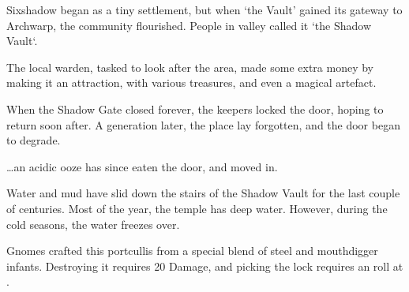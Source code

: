 
\begin{exampletext}
  Sixshadow began as a tiny settlement, but when `the Vault' gained its gateway to Archwarp, the community flourished.
  People in \gls{valley} called it `the Shadow Vault`.

  The local \gls{warden}, tasked to look after the area, made some extra money by making it an attraction, with various treasures, and even a magical \gls{artefact}.

  When the Shadow Gate closed forever, the keepers locked the door, hoping to return soon after.
  A generation later, the place lay forgotten, and the door began to degrade.

  \ldots an acidic ooze has since eaten the door, and moved in.
\end{exampletext}

Water and mud have slid down the stairs of the Shadow Vault for the last couple of centuries.
Most of the year, the temple has deep water.
However, during the cold seasons, the water freezes over.


Gnomes crafted this portcullis from a special blend of steel and mouthdigger infants.
Destroying it requires 20 Damage, and picking the lock requires an  roll at \tn[15].




